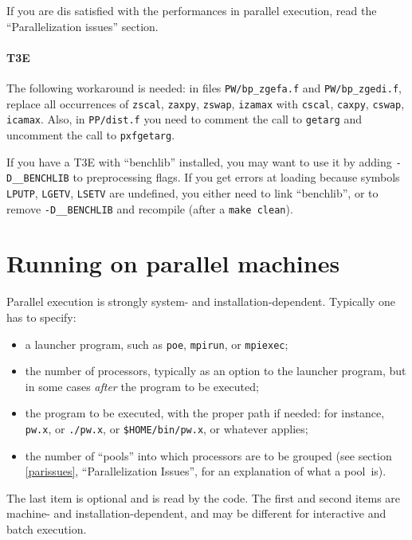 \documentclass[12pt,a4paper]{article}
\begin{document}
If you are dis satisfied with the performances in parallel 
execution, read the ``Parallelization issues'' section.

\paragraph{T3E}

The following workaround is needed: in files \texttt{PW/bp\_zgefa.f}
and \texttt{PW/bp\_zgedi.f}, replace all occurrences of
\texttt{zscal}, \texttt{zaxpy}, \texttt{zswap}, \texttt{izamax} with
\texttt{cscal}, \texttt{caxpy}, \texttt{cswap}, \texttt{icamax}.
Also, in \texttt{PP/dist.f} you need to comment the call to
\texttt{getarg} and uncomment the call to \texttt{pxfgetarg}.

If you have a T3E with ``benchlib'' installed, you may want to use it
by adding \texttt{-D\_\_BENCHLIB} to preprocessing flags.
If you get errors at loading because symbols \texttt{LPUTP},
\texttt{LGETV}, \texttt{LSETV} are undefined, you either need to link
``benchlib'', or to remove \texttt{-D\_\_BENCHLIB} and recompile
(after a \texttt{make clean}).

\clearpage

\section{Running on parallel machines}
  \label{runparallel}

Parallel execution is strongly system- and installation-dependent.
Typically one has to specify:

\begin{itemize}
  \item a launcher program, such as \texttt{poe}, \texttt{mpirun}, or
        \texttt{mpiexec};
  \item the number of processors, typically as an option to the
        launcher program, but in some cases \emph{after} the program
        to be executed;
  \item the program to be executed, with the proper path if needed:
        for instance, \texttt{pw.x}, or \texttt{./pw.x}, or
        \texttt{\$HOME/bin/pw.x}, or whatever applies;
  \item the number of ``pools'' into which processors are to be
        grouped (see section \ref{parissues}, ``Parallelization
        Issues'', for an explanation of what a pool~is).
\end{itemize}

The last item is optional and is read by the code.
The first and second items are machine- and installation-dependent,
and may be different for interactive and batch execution.
\end{document}

